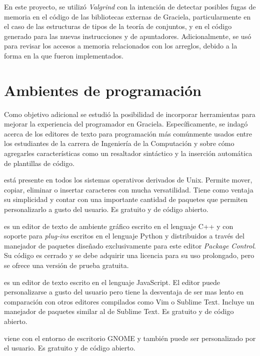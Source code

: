 En este proyecto, se utilizó \textit{Valgrind} con la intención de detectar
posibles fugas de memoria en el código de las bibliotecas externas de Graciela,
particularmente en el caso de las estructuras de tipos de la teoría de
conjuntos, y en el código generado para las nuevas instrucciones  y
 de apuntadores. Adicionalmente, se usó para revisar los accesos a
memoria relacionados con los arreglos, debido a la forma en la que fueron
implementados.

\section{Ambientes de programación}

Como objetivo adicional se estudió la posibilidad de incorporar herramientas
para mejorar la experiencia del programador en Graciela. Específicamente, se
indagó acerca de los editores de texto para programación más comúnmente usados
entre los estudiantes de la carrera de Ingeniería de la Computación y sobre cómo
agregarles características como un resaltador sintáctico y la inserción
automática de plantillas de código.

\begin{description}[leftmargin=!,labelwidth=\widthof{\bfseries Sublime Text}]

  \item [Vi / Vim] está presente en todos los sistemas operativos derivados de
  Unix. Permite mover, copiar, eliminar o insertar caracteres con mucha
  versatilidad. Tiene como ventaja su simplicidad y contar con una importante
  cantidad de paquetes que permiten personalizarlo a gusto del usuario. Es
  gratuito y de código abierto.

  \item [Sublime Text] es un editor de texto de ambiente gráfico escrito en el
  lenguaje C++ y con soporte para \textit{plug-ins} escritos en el lenguaje
  Python y distribuidos a través del manejador de paquetes diseñado
  exclusivamente para este editor \textit{Package Control}. Su código es cerrado
  y se debe adquirir una licencia para su uso prolongado, pero se ofrece una
  versión de prueba gratuita.

  \item [Atom] es un editor de texto escrito en el lenguaje JavaScript. El
  editor puede personalizarse a gusto del usuario pero tiene la desventaja de
  ser mas lento en comparación con otros editores compilados como Vim o Sublime
  Text. Incluye un manejador de paquetes similar al de Sublime Text. Es gratuito
  y de código abierto.

  \item [Gedit] viene con el entorno de escritorio GNOME y también puede ser
  personalizado por el usuario. Es gratuito y de código abierto.

\end{description}

